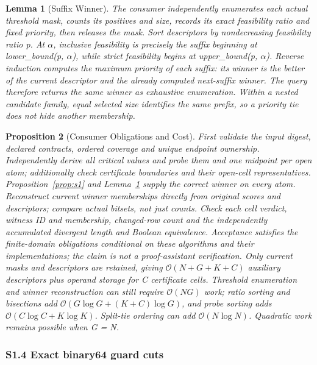 \documentclass[11pt,a4paper]{article}
\theoremstyle{plain}
\newtheorem{proposition}{Proposition}
\newtheorem{lemma}[proposition]{Lemma}
\theoremstyle{definition}
\theoremstyle{remark}
\begin{document}
\begin{lemma}[Suffix Winner]\label{lem:s4}
The consumer independently enumerates each actual threshold mask, counts its positives and size, records its exact feasibility ratio and fixed priority, then releases the mask. Sort descriptors by nondecreasing feasibility ratio p. At $\alpha$, inclusive feasibility is precisely the suffix beginning at lower\_bound(p, $\alpha$), while strict feasibility begins at upper\_bound(p, $\alpha$). Reverse induction computes the maximum priority of each suffix: its winner is the better of the current descriptor and the already computed next-suffix winner. The query therefore returns the same winner as exhaustive enumeration. Within a nested candidate family, equal selected size identifies the same prefix, so a priority tie does not hide another membership.
\end{lemma}
\begin{proposition}[Consumer Obligations and Cost]\label{prop:s5}
First validate the input digest, declared contracts, ordered coverage and unique endpoint ownership. Independently derive all critical values and probe them and one midpoint per open atom; additionally check certificate boundaries and their open-cell representatives. Proposition~\ref{prop:s1} and Lemma~\ref{lem:s4} supply the correct winner on every atom. Reconstruct current winner memberships directly from original scores and descriptors; compare actual bitsets, not just counts. Check each cell verdict, witness ID and membership, changed-row count and the independently accumulated divergent length and Boolean equivalence. Acceptance satisfies the finite-domain obligations conditional on these algorithms and their implementations; the claim is not a proof-assistant verification. Only current masks and descriptors are retained, giving $\mathcal{O}(N + G + K + C)$ auxiliary descriptors plus operand storage for C certificate cells. Threshold enumeration and winner reconstruction can still require $\mathcal{O}(NG)$ work; ratio sorting and bisections add $\mathcal{O}(G \log G + (K+C) \log G)$, and probe sorting adds $\mathcal{O}(C \log C + K \log K)$. Split-tie ordering can add $\mathcal{O}(N \log N)$. Quadratic work remains possible when G = N.
\end{proposition}

\subsubsection*{S1.4 Exact binary64 guard cuts}\label{sec:s1_4}
\end{document}

